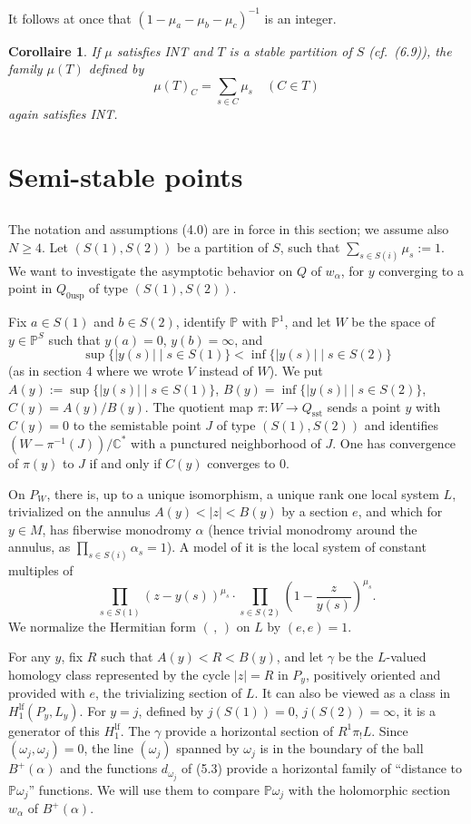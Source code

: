 \documentclass[12pt,a4paper]{article}
\theoremstyle{plain}
\newtheorem{corollary}[theorem]{Corollaire}
\theoremstyle{definition}
\theoremstyle{remark}
\newcommand{\CC}{\mathbb{C}}
\newcommand{\PP}{\mathbb{P}}
\numberwithin{equation}{section}
\providecommand{\CC}{\mathbb{C}}
\providecommand{\PP}{\mathbb{P}}
\begin{document}
It follows at once that $(1 - \mu_a - \mu_b - \mu_c)^{-1}$ is an integer.

\begin{corollary}\label{cor:6.11}
If $\mu$ satisfies INT and $T$ is a stable partition of $S$ (cf.\ (6.9)), the family $\mu(T)$ defined by
\[
\mu(T)_C = \sum_{s \in C} \mu_s \quad (C \in T)
\]
again satisfies INT.
\end{corollary}


\section{Semi-stable points}

\subsection{}
The notation and assumptions (4.0) are in force in this section; we assume also $N \geq 4$. Let $(S(1), S(2))$ be a partition of $S$, such that $\sum_{s \in S(i)} \mu_s := 1$. We want to investigate the asymptotic behavior on $Q$ of $w_\alpha$, for $y$ converging to a point in $Q_{0\mathrm{usp}}$ of type $(S(1), S(2))$.

Fix $a \in S(1)$ and $b \in S(2)$, identify $\PP$ with $\PP^1$, and let $W$ be the space of $y \in \PP^S$ such that $y(a) = 0$, $y(b) = \infty$, and
\[
\sup \{|y(s)| \mid s \in S(1)\} < \inf \{|y(s)| \mid s \in S(2)\}
\]
(as in section 4 where we wrote $V$ instead of $W$). We put $A(y) := \sup \{|y(s)| \mid s \in S(1)\}$, $B(y) = \inf\{|y(s)| \mid s \in S(2)\}$, $C(y) = A(y)/B(y)$. The quotient map $\pi: W \to Q_{\mathrm{sst}}$ sends a point $y$ with $C(y) = 0$ to the semistable point $J$ of type $(S(1), S(2))$ and identifies $(W - \pi^{-1}(J))/\CC^*$ with a punctured neighborhood of $J$. One has convergence of $\pi(y)$ to $J$ if and only if $C(y)$ converges to $0$.

On $P_W$, there is, up to a unique isomorphism, a unique rank one local system $L$, trivialized on the annulus $A(y) < |z| < B(y)$ by a section $e$, and which for $y \in M$, has fiberwise monodromy $\alpha$ (hence trivial monodromy around the annulus, as $\prod_{s \in S(i)} \alpha_s = 1$). A model of it is the local system of constant multiples of
\[
\prod_{s \in S(1)} (z - y(s))^{\mu_s} \cdot \prod_{s \in S(2)} \left(1 - \frac{z}{y(s)}\right)^{\mu_s}.
\]
We normalize the Hermitian form $(\,,\,)$ on $L$ by $(e, e) = 1$.

For any $y$, fix $R$ such that $A(y) < R < B(y)$, and let $\gamma$ be the $L$-valued homology class represented by the cycle $|z| = R$ in $P_y$, positively oriented and provided with $e$, the trivializing section of $L$. It can also be viewed as a class in $H^{\mathrm{lf}}_1(P_y, L_y)$. For $y = j$, defined by $j(S(1)) = 0$, $j(S(2)) = \infty$, it is a generator of this $H^{\mathrm{lf}}_1$. The $\gamma$ provide a horizontal section of $R^1\pi_! L$. Since $(\omega_j, \omega_j) = 0$, the line $(\omega_j)$ spanned by $\omega_j$ is in the boundary of the ball $B^+(\alpha)$ and the functions $d_{\omega_j}$ of (5.3) provide a horizontal family of ``distance to $\PP \omega_j$'' functions. We will use them to compare $\PP \omega_j$ with the holomorphic section $w_\alpha$ of $B^+(\alpha)$.
\end{document}
